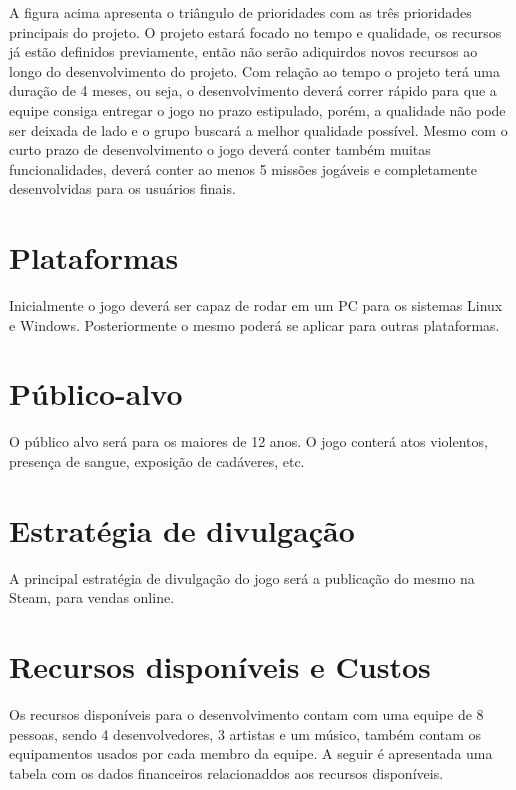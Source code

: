 \documentclass[11pt]{article} %
\begin{document}
A figura acima apresenta o triângulo de prioridades com as três prioridades principais do projeto. O projeto estará focado no tempo e qualidade, os recursos já estão definidos previamente, então não serão adiquirdos novos recursos ao longo do desenvolvimento do projeto. Com relação ao tempo o projeto terá uma duração de 4 meses, ou seja, o desenvolvimento deverá correr rápido para que a equipe consiga entregar o jogo no prazo estipulado, porém, a qualidade não pode ser deixada de lado e o grupo buscará a melhor qualidade possível. 
Mesmo com o curto prazo de desenvolvimento o jogo deverá conter também muitas funcionalidades, deverá conter ao menos 5 missões jogáveis e completamente desenvolvidas para os usuários finais.

\section{Plataformas}

Inicialmente o jogo deverá ser capaz de rodar em um PC para os sistemas Linux e Windows. Posteriormente o mesmo poderá se aplicar para outras plataformas.

\section{Público-alvo}

O público alvo será para os maiores de 12 anos. O jogo conterá atos violentos, presença de sangue, exposição de cadáveres, etc.

\section{Estratégia de divulgação}

A principal estratégia de divulgação do jogo será a publicação do mesmo na Steam, para vendas online.

\section{Recursos disponíveis e Custos}

Os recursos disponíveis para o desenvolvimento contam com uma equipe de 8 pessoas, sendo 4 desenvolvedores, 3 artistas e um músico, também contam os equipamentos usados por cada membro da equipe. A seguir é apresentada uma tabela com os dados financeiros relacionaddos aos recursos disponíveis.
\end{document}
